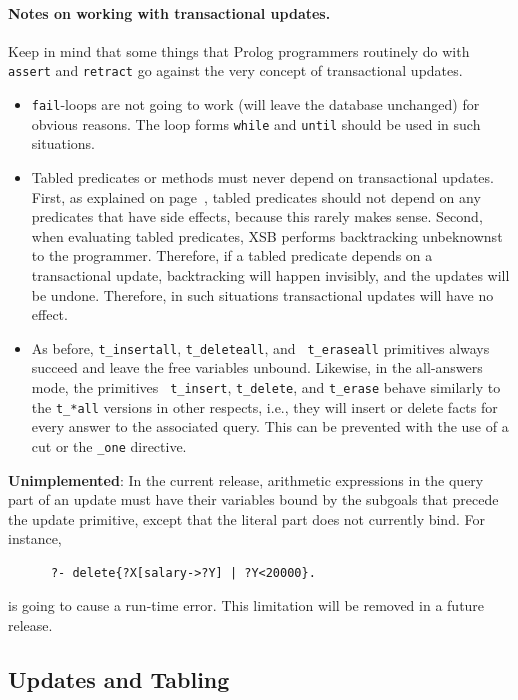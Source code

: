 \documentclass[11pt]{article}
\begin{document}
\paragraph{Notes on working with transactional updates.}
Keep in mind that some things that Prolog programmers routinely do with
{\tt assert} and {\tt retract} go against the very concept of
transactional updates.
\begin{itemize}
  \item
    {\tt fail}-loops are not going to
    work (will leave the database unchanged) for obvious reasons. The loop forms
    {\tt while} and {\tt until} should be used in such situations.
  \item Tabled predicates or methods must never depend on transactional
    updates. First, as explained on page~\pageref{page-depchk},
    tabled predicates should not depend on any predicates that have side
    effects, because this rarely makes sense. Second, when evaluating
    tabled predicates, XSB performs backtracking unbeknownst to the
    programmer. Therefore, if a tabled predicate depends on a
    transactional update, backtracking will happen invisibly, and the
    updates will be undone. Therefore, in such situations transactional
    updates will have no effect.
    
  \item As before, {\tt t\_insertall}, {\tt t\_deleteall}, and {\tt
      t\_eraseall} primitives always succeed and leave the free variables
    unbound.  Likewise, in the all-answers mode, the primitives {\tt
      t\_insert}, {\tt t\_delete}, and {\tt t\_erase} behave similarly to the
    {\tt t\_*all} versions in other respects, i.e., they will insert
    or delete facts for every answer to the associated query. This can be
    prevented with the use of a cut or the {\tt \_one} directive.
\end{itemize}

\noindent
{\bf Unimplemented}: In the current release, arithmetic expressions in the
query part of an update must have their variables bound by the subgoals
that precede the update primitive, except that the literal part does not
currently bind. For instance, 
\begin{verbatim}
      ?- delete{?X[salary->?Y] | ?Y<20000}.
\end{verbatim}
is going to cause a run-time error. This limitation will be removed in a
future release.


\subsection{Updates and Tabling}
\end{document}
